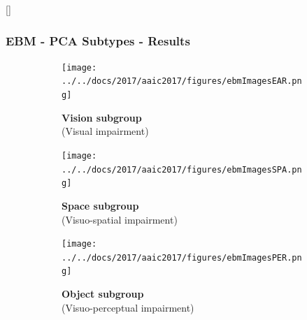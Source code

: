 \documentclass[10pt,xcolor=table]{beamer}
\begin{document}
\makeatletter
{}[]{}
\makeatother

\begin{frame}
\frametitle{EBM - PCA Subtypes - Results}


\begin{figure}
  \centering
 \begin{subfigure}{0.6\textwidth}
  \texttt{[image: ../../docs/2017/aaic2017/figures/ebmImagesEAR.png]}
 \end{subfigure}
 \begin{subfigure}{0.3\textwidth}
 \centering
 \scriptsize{\textbf{Vision subgroup}\\ (Visual impairment)}
 \end{subfigure}

  \begin{subfigure}{0.6\textwidth}
  \texttt{[image: ../../docs/2017/aaic2017/figures/ebmImagesSPA.png]}
 \end{subfigure}
  \begin{subfigure}{0.3\textwidth}
  \centering
 \scriptsize{\textbf{Space subgroup}\\ (Visuo-spatial impairment)}
 \end{subfigure}
 
 \begin{subfigure}{0.6\textwidth}
  \texttt{[image: ../../docs/2017/aaic2017/figures/ebmImagesPER.png]}
 \end{subfigure}
  \begin{subfigure}{0.3\textwidth}
  \centering
 \scriptsize{\textbf{Object subgroup}\\ (Visuo-perceptual impairment)}
 \end{subfigure}
 
 
\end{figure}

\end{frame}

\newcommand{\semitransp}[2][35]{\color{fg!#1}#2}
\end{document}

